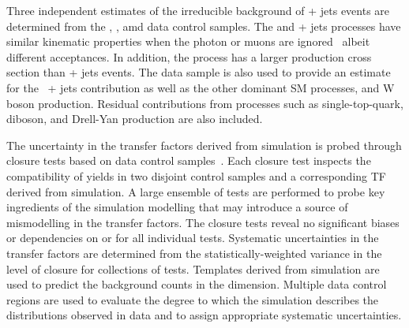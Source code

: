 Three independent estimates of the irreducible background of \znunu +
jets events are determined from the \gj, \mmj, amd \mj data control
samples.  The \gj and \zmumu + jets processes have similar kinematic
properties when the photon or muons are ignored~\cite{Bern:2011pa}
albeit different acceptances. In addition, the \gj process has a
larger production cross section than \znunu + jets events. The \mj
data sample is also used to provide an estimate for the \znunu\ + jets
contribution as well as the other dominant SM processes, \ttbar and W
boson production. Residual contributions from processes such as
single-top-quark, diboson, and Drell-Yan production are also included.

The uncertainty in the transfer factors derived from simulation is
probed through closure tests based on data control
samples~\cite{RA1Paper2012}. Each closure test inspects the
compatibility of yields in two disjoint control samples and a
corresponding TF derived from simulation. A large ensemble of tests
are performed to probe key ingredients of the simulation modelling
that may introduce a source of mismodelling in the transfer
factors. The closure tests reveal no significant biases or
dependencies on \njet or \scalht for all individual tests. Systematic
uncertainties in the transfer factors are determined from the
statistically-weighted variance in the level of closure for
collections of tests. Templates derived from simulation are used to
predict the background counts in the \mht dimension. Multiple data
control regions are used to evaluate the degree to which the
simulation describes the \mht distributions observed in data and to
assign appropriate systematic uncertainties.

